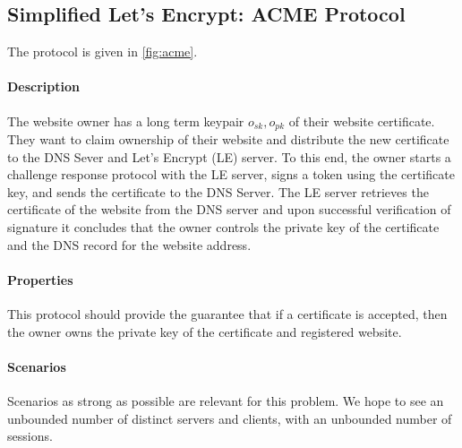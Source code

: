 \documentclass{article}
\newcommand{\sfsk}{\mathit{sk}}
\newcommand{\sfpk}{\mathit{pk}}
\begin{document}
\subsection{Simplified Let's Encrypt: ACME Protocol}\label{prob:acme}

The protocol is given in \cref{fig:acme}.

 \paragraph{Description} The website owner has a long term keypair $o_\sfsk,o_\sfpk$ of their website certificate.
They want to claim ownership of their website and distribute the new certificate to the DNS Sever and Let's Encrypt (LE) server. To this end, the owner starts a challenge response protocol with the LE server, signs a token using the certificate key, and sends the certificate to the DNS Server. The LE server retrieves the certificate of the website from the DNS server and upon successful verification of signature it concludes that the owner controls the private key of the certificate and the DNS record for the website address.

\paragraph{Properties} This protocol should provide the guarantee that if a certificate is accepted, then the owner owns the private key of the certificate and registered website.

\paragraph{Scenarios} Scenarios as strong as possible are relevant for this problem. We hope to see an unbounded number of distinct servers and clients, with an unbounded number of sessions. 
\end{document}
